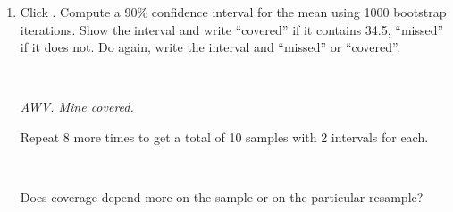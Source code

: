 \begin{enumerate}
\begin{enumerate}
\item Click .  Compute a 90\%
  confidence interval for the mean using 1000 bootstrap
  iterations. Show the interval and write ``covered'' if it contains
  34.5, ``missed'' if it does not.  Do  again, write the
  interval and ``missed'' or ``covered''.
\begin{students}
        \vspace{2cm}\\        
\end{students}
\begin{key}
  {\it AWV. Mine covered.}
\end{key}
   Repeat 8 more times to get a total of 10 samples with 2 intervals
   for each.
\begin{students}
        \vspace{3cm} \\       
\end{students}
   Does coverage depend more on the sample or on the particular resample?


\end{enumerate}
\end{enumerate}
